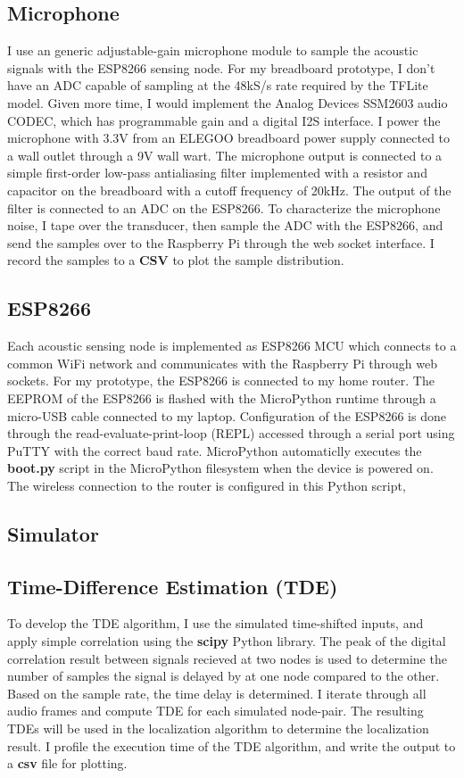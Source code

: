 \documentclass[12pt]{article}
\begin{document}
\subsection{Microphone}
	I use an generic adjustable-gain microphone module to sample the acoustic signals with the ESP8266 sensing node. For my breadboard prototype, I don't have an ADC capable of sampling at the 48kS/s rate required by the TFLite model. Given more time, I would implement the Analog Devices SSM2603 audio CODEC, which has programmable gain and a digital I2S interface. 
	I power the microphone with 3.3V from an ELEGOO breadboard power supply connected to a wall outlet through a 9V wall wart. The microphone output is connected to a simple first-order low-pass antialiasing filter implemented with a resistor and capacitor on the breadboard with a cutoff frequency of 20kHz. The output of the filter is connected to an ADC on the ESP8266.
	To characterize the microphone noise, I tape over the transducer, then sample the ADC with the ESP8266, and send the samples over to the Raspberry Pi through the web socket interface. I record the samples to a \textbf{CSV} to plot the sample distribution.

\subsection{ESP8266}
	Each acoustic sensing node is implemented as ESP8266 MCU which connects to a common WiFi network and communicates with the Raspberry Pi through web sockets. For my prototype, the ESP8266 is connected to my home router. The EEPROM of the ESP8266 is flashed with the MicroPython runtime through a micro-USB cable connected to my laptop. Configuration of the ESP8266 is done through the read-evaluate-print-loop (REPL) accessed through a serial port using PuTTY with the correct baud rate. MicroPython automaticlly executes the \textbf{boot.py} script in the MicroPython filesystem when the device is powered on. The wireless connection to the router is configured in this Python script,  

\subsection{Simulator}
	

\subsection{Time-Difference Estimation (TDE)}
	To develop the TDE algorithm, I use the simulated time-shifted inputs, and apply simple correlation using the \textbf{scipy} Python library. The peak of the digital correlation result between signals recieved at two nodes is used to determine the number of samples the signal is delayed by at one node compared to the other. Based on the sample rate, the time delay is determined.
	I iterate through all audio frames and compute TDE for each simulated node-pair. The resulting TDEs will be used in the localization algorithm to determine the localization result. I profile the execution time of the TDE algorithm, and write the output to a \textbf{csv} file for plotting.
	
\end{document}
